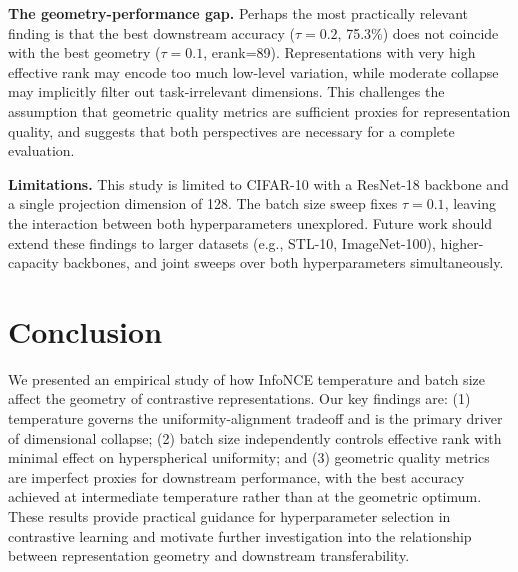 \documentclass{article}
\begin{document}
\textbf{The geometry-performance gap.} Perhaps the most practically relevant 
finding is that the best downstream accuracy ($\tau=0.2$, 75.3\%) does not 
coincide with the best geometry ($\tau=0.1$, erank=89). Representations 
with very high effective rank may encode too much low-level variation, while 
moderate collapse may implicitly filter out task-irrelevant dimensions. This 
challenges the assumption that geometric quality metrics are sufficient 
proxies for representation quality, and suggests that both perspectives are 
necessary for a complete evaluation.

\textbf{Limitations.} This study is limited to CIFAR-10 with a ResNet-18 
backbone and a single projection dimension of 128. The batch size sweep 
fixes $\tau=0.1$, leaving the interaction between both hyperparameters 
unexplored. Future work should extend these findings to larger datasets 
(e.g., STL-10, ImageNet-100), higher-capacity backbones, and joint sweeps 
over both hyperparameters simultaneously.

\section{Conclusion}

We presented an empirical study of how InfoNCE temperature and batch size 
affect the geometry of contrastive representations. Our key findings are: 
(1) temperature governs the uniformity-alignment tradeoff and is the primary 
driver of dimensional collapse; (2) batch size independently controls 
effective rank with minimal effect on hyperspherical uniformity; and (3) 
geometric quality metrics are imperfect proxies for downstream performance, 
with the best accuracy achieved at intermediate temperature rather than at 
the geometric optimum. These results provide practical guidance for 
hyperparameter selection in contrastive learning and motivate further 
investigation into the relationship between representation geometry and 
downstream transferability.



\end{document}
